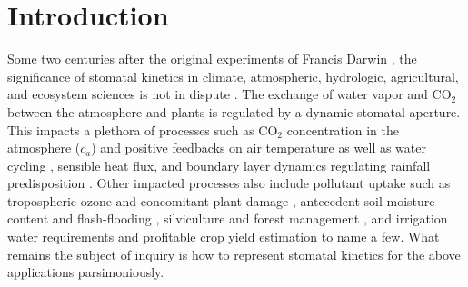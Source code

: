 \documentclass[utf8]{frontiersSCNS} %
\begin{document}
\section{Introduction}
Some two centuries after the original experiments of Francis Darwin \citep{darwin1898ix,scarth1927stomatal}, the significance of stomatal kinetics in climate, atmospheric, hydrologic, agricultural, and ecosystem sciences is not in dispute \citep{hetherington2003role}.  The exchange of water vapor and CO$_2$ between the atmosphere and plants is regulated by a dynamic stomatal aperture. This impacts a plethora of processes such as CO$_2$ concentration in the atmosphere ($c_a$) and positive feedbacks on air temperature \citep{cox2000acceleration} as well as water cycling \citep{betts2007projected,katul2012evapotranspiration}, sensible heat flux, and boundary layer dynamics regulating rainfall predisposition \citep{siqueira2009soil, manoli2016soil}. Other impacted processes also include pollutant uptake such as tropospheric ozone and concomitant plant damage \citep{rich1964ozone,musselman2006critical}, antecedent soil moisture content and flash-flooding \citep{javelle2010flash}, silviculture and forest management \citep{makela1986stand}, and irrigation water requirements and profitable crop yield estimation \citep{vico2015ecohydrology} to name a few.  What remains the subject of inquiry is how to represent stomatal kinetics for the above applications parsimoniously. 
\end{document}
